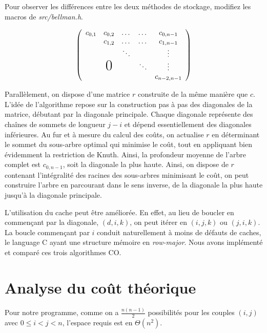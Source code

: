 \documentclass[a4paper, 10pt, french]{article}
\begin{document}
Pour observer les différences entre les deux méthodes de stockage, modifiez les macros de {\em src/bellman.h}.

\par\leavevmode\par
\[
  \left(
  \begin{array}{ccccc}
      c_{0,1} & c_{0,2}       & \dots  & \dots  & c_{0,n-1}   \\
              & c_{1,2}       & \dots  & \dots  & c_{1,n-1}   \\
              &               & \ddots &        & \vdots      \\
              & \text{\huge0} &        & \ddots & \vdots      \\
              &               &        &        & c_{n-2,n-1}
    \end{array}
  \right)
\]
\par\leavevmode\par
Parallèlement, on dispose d'une matrice $r$ construite de la même manière que $c$. L'idée de l'algorithme repose sur la construction pas à pas des diagonales de la matrice, débutant par la diagonale principale. Chaque diagonale représente des chaînes de sommets de longueur $j - i$ et dépend essentiellement des diagonales inférieures. Au fur et à mesure du calcul des coûts, on actualise $r$ en déterminant le sommet du sous-arbre optimal qui minimise le coût, tout en appliquant bien évidemment la restriction de Knuth. Ainsi, la profondeur moyenne de l'arbre complet est $c_{0,n-1}$, soit la diagonale la plus haute.
Ainsi, on dispose de $r$ contenant l'intégralité des racines des sous-arbres minimisant le coût, on peut construire l'arbre en parcourant dans le sens inverse, de la diagonale la plus haute jusqu'à la diagonale principale.

L'utilisation du cache peut être améliorée. En effet, au lieu de boucler en commençant par la diagonale, $(d, i, k)$, on peut itérer en $(i, j, k)$ ou $(j, i, k)$. La boucle commençant par $i$ conduit naturellement à moins de défauts de caches, le language C ayant une structure mémoire en {\em row-major}. Nous avons implémenté et comparé ces trois algorithmes CO.

\section{Analyse du coût théorique}
Pour notre programme, comme on a $\frac{n(n-1)}{2}$ possibilités pour les couples $(i, j)$ avec $0 \leq i < j < n$, l'espace requis est en $\Theta(n^2)$.
\end{document}
